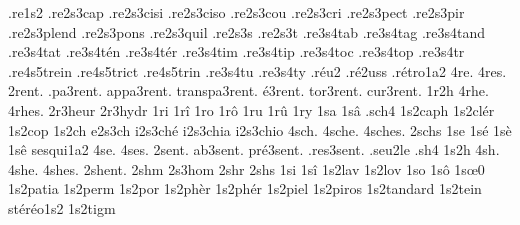 {                    .re1s2
                    .re2s3cap
                    .re2s3cisi %
                    .re2s3ciso %
                    .re2s3cou
                    .re2s3cri
                    .re2s3pect
                    .re2s3pir
                    .re2s3plend
                    .re2s3pons
                    .re2s3quil
                    .re2s3s
                    .re2s3t
                    .re3s4tab
                    .re3s4tag
                    .re3s4tand
                    .re3s4tat
                    .re3s4t\'en
                    .re3s4t\'er
                    .re3s4tim
                    .re3s4tip
                    .re3s4toc
                    .re3s4top
                    .re3s4tr
                    .re4s5trein
                    .re4s5trict
                    .re4s5trin
                    .re3s4tu
                    .re3s4ty
                    .r\'eu2 %
                    .r\'e2uss
                    .r\'etro1a2
4re.
4res.
       2rent. %
    .pa3rent.
   appa3rent.
transpa3rent.
    \'e3rent.
    tor3rent.
    cur3rent.
%
1r2h
4rhe.
4rhes.
                    2r3heur
                    2r3hydr
1ri
1r\^i
1ro
1r\^o
1ru
1r\^u
1ry
1sa
1s\^a
.sch4
                    1s2caph
                    1s2cl\'er
                    1s2cop
 1s2ch
e2s3ch
i2s3ch\'e
i2s3chia
i2s3chio
4sch.
4sche.
4sches.
2schs
1se
1s\'e
1s\`e
1s\^e
                    sesqui1a2
4se.
4ses.
     2sent. %
   ab3sent.
pr\'e3sent.
 .res3sent.
%
.seu2le %
.sh4
1s2h
4sh.
4she.
4shes.
2shent. %
2shm
                    2s3hom
2shr
2shs
1si
1s\^i
                    1s2lav
                    1s2lov
1so
1s\^o
1s\oe0 %
                    1s2patia
                    1s2perm
                    1s2por
                    1s2ph\`er
                    1s2ph\'er
                    1s2piel
                    1s2piros
                    1s2tandard
                    1s2tein
                    st\'er\'eo1s2
                    1s2tigm
}
